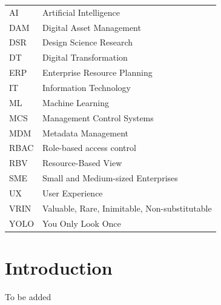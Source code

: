 \documentclass[a4paper,10pt,twocolumn]{article}
\numberwithin{figure}{section}
\numberwithin{table}{section}
\begin{document}
\renewcommand{\arraystretch}{1.2} %
\begin{flushleft} %
\begin{longtable}{p{5cm} p{12cm}} %
    
    AI   & Artificial Intelligence \\
    DAM  & Digital Asset Management \\
    DSR  & Design Science Research \\
    DT   & Digital Transformation \\
    ERP  & Enterprise Resource Planning \\
    IT   & Information Technology \\
    ML   & Machine Learning \\
    MCS  & Management Control Systems \\
    MDM  & Metadata Management \\
    RBAC & Role-based access control \\
    RBV  & Resource-Based View \\
    SME  & Small and Medium-sized Enterprises \\
    UX   & User Experience \\
    VRIN & Valuable, Rare, Inimitable, Non-substitutable \\
    YOLO & You Only Look Once \\
    
\end{longtable}
\end{flushleft}



\twocolumn
\flushbottom %


\sloppy        %



\section{Introduction}

To be added 
\end{document}
